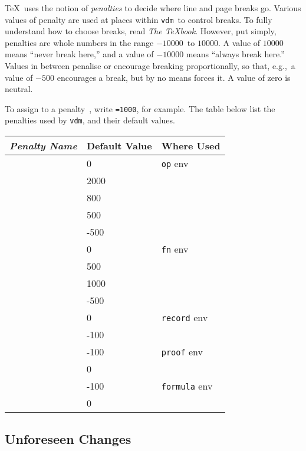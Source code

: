 \documentclass{article}
\newcommand{\Vdm}{{\tt vdm\/}}
\renewcommand{\^}[1]{$\langle${\rm #1\/}$\rangle$}
\newcommand{\cs}[1]{\leavevmode\hbox{\tt \string#1}}
\begin{document}
\TeX\ uses the notion of {\em penalties\/} to decide where line and
page breaks go.  Various values of penalty are used at places within
\Vdm\ to control breaks.  To fully understand how to choose breaks,
read {\em The \TeX{}book}.  However, put simply, penalties are whole
numbers in the range $\minus10000$~to $10000$.  A value of $10000$
means ``never break here,'' and a value of $\minus10000$ means
``always break here.''  Values in between penalise or encourage
breaking proportionally, so that, e.g.,~a value of $\minus500$
encourages a break, but by no means forces it.  A value of zero is
neutral.

To assign to a penalty~\cs\p, write {\tt \cs\p=1000}, for example.
The table below list the penalties used by \Vdm, and their default
values.

\begin{center}
\begin{tabular}{|l|l|l|}
\hline
\em Penalty Name & Default Value & Where Used \\
\hline
\cs\preOperationPenalty & 0     & {\tt op} env \\
\cs\preExternalPenalty  & 2000  & \\
\cs\prePreConditionPenalty      & 800   & \\
\cs\prePostConditionPenalty     & 500   & \\
\cs\postOperationPenalty        & -500  & \\
\hline
\cs\preFunctionPenalty  & 0     & {\tt fn} env \\
\cs\betweenSignatureAndBodyPenalty&500&\\
\cs\betweenFunctionAndPrePenalty&1000&\\
\cs\postFunctionPenalty & -500  & \\
\hline
\cs\preRecordPenalty    & 0     & {\tt record} env\\
\cs\postRecordPenalty   & -100  & \\
\hline
\cs\preProofPenalty     & -100  & {\tt proof} env\\
\cs\postProofPenalty    & 0     & \\
\hline
\cs\preFormulaPenalty   & -100  & {\tt formula} env\\
\cs\postFormulaPenalty  & 0     & \\
\hline
\end{tabular}
\end{center}


\subsection{Unforeseen Changes}
\end{document}
